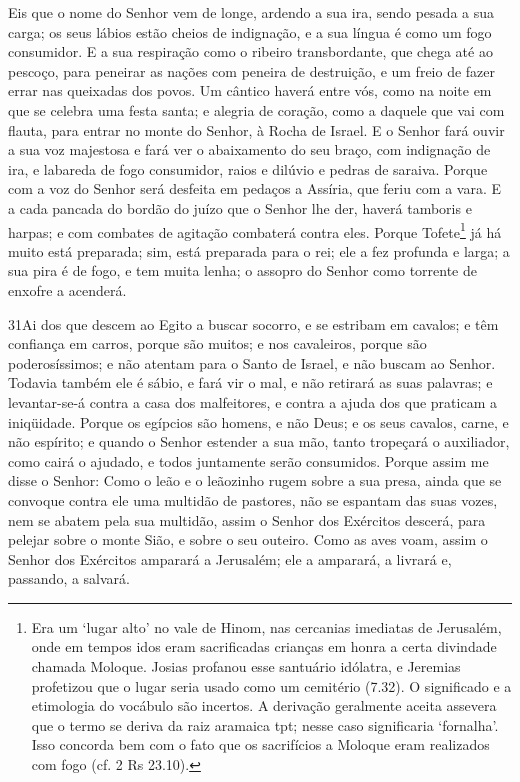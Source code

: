 Eis que o nome do Senhor vem de longe, ardendo a sua ira, sendo
pesada a sua carga; os seus lábios estão cheios de indignação, e a
sua língua é como um fogo consumidor. E a sua respiração como
o ribeiro transbordante, que chega até ao pescoço, para peneirar as
nações com peneira de destruição, e um freio de fazer errar nas
queixadas dos povos. Um cântico haverá entre vós, como na
noite em que se celebra uma festa santa; e alegria de coração, como
a daquele que vai com flauta, para entrar no monte do Senhor, à
Rocha de Israel. E o Senhor fará ouvir a sua voz majestosa e
fará ver o abaixamento do seu braço, com indignação de ira, e
labareda de fogo consumidor, raios e dilúvio e pedras de saraiva.
Porque com a voz do Senhor será desfeita em pedaços a
Assíria, que feriu com a vara. E a cada pancada do bordão do
juízo que o Senhor lhe der, haverá tamboris e harpas; e com combates
de agitação combaterá contra eles. Porque Tofete\footnote{Era
um `lugar alto' no vale de Hinom, nas cercanias imediatas de
Jerusalém, onde em tempos idos eram sacrificadas crianças em honra a
certa divindade chamada Moloque. Josias profanou esse santuário
idólatra, e Jeremias profetizou que o lugar seria usado como um
cemitério (7.32). O significado e a etimologia do vocábulo são
incertos. A derivação geralmente aceita assevera que o termo se
deriva da raiz aramaica tpt; nesse caso significaria `fornalha'.
Isso concorda bem com o fato que os sacrifícios a Moloque eram
realizados com fogo (cf. 2 Rs 23.10).} já há muito está preparada;
sim, está preparada para o rei; ele a fez profunda e larga; a sua
pira é de fogo, e tem muita lenha; o assopro do Senhor como torrente
de enxofre a acenderá.

\medskip

\lettrine{31}{}Ai dos que descem ao Egito a buscar socorro, e
se estribam em cavalos; e têm confiança em carros, porque são
muitos; e nos cavaleiros, porque são poderosíssimos; e não atentam
para o Santo de Israel, e não buscam ao Senhor. Todavia também
ele é sábio, e fará vir o mal, e não retirará as suas palavras; e
levantar-se-á contra a casa dos malfeitores, e contra a ajuda dos
que praticam a iniqüidade. Porque os egípcios são homens, e não
Deus; e os seus cavalos, carne, e não espírito; e quando o Senhor
estender a sua mão, tanto tropeçará o auxiliador, como cairá o
ajudado, e todos juntamente serão consumidos. Porque assim me
disse o Senhor: Como o leão e o leãozinho rugem sobre a sua presa,
ainda que se convoque contra ele uma multidão de pastores, não se
espantam das suas vozes, nem se abatem pela sua multidão, assim o
Senhor dos Exércitos descerá, para pelejar sobre o monte Sião, e
sobre o seu outeiro. Como as aves voam, assim o Senhor dos
Exércitos amparará a Jerusalém; ele a amparará, a livrará e,
passando, a salvará.

